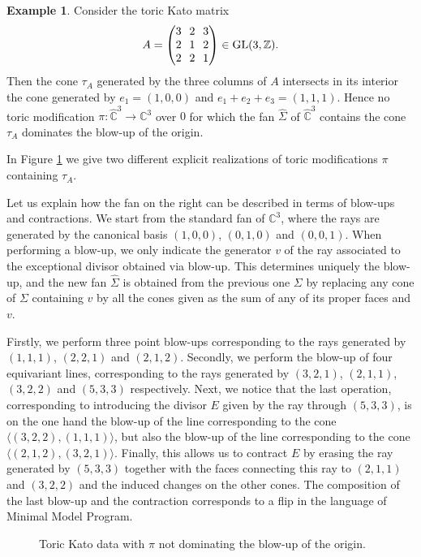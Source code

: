 \documentclass[JEP,XML,SOM,Unicode,NoFloatCountersInSection]{cedram}
\theoremstyle{definition}
\newtheorem{example}[theorem]{Example}
\newcommand{\CC}{\mathbb{C}}
\newcommand{\ZZ}{\mathbb{Z}}
\DeclareMathOperator{\GL}{GL}
\begin{document}
\begin{example}
Consider the toric Kato matrix
\[\arraycolsep3.5pt
A=\begin{pmatrix}
3 & 2 & 3 \\
2 & 1 & 2 \\
2 & 2 & 1
\end{pmatrix}
\in \GL(3,\ZZ).
\]
Then the cone $\tau_A$ generated by the three columns of $A$ intersects in its interior the cone generated by $e_1=(1,0,0)$ and $e_1+e_2+e_3=(1,1,1)$. Hence no toric modification $\pi:\hat{\CC}^3 \to \CC^3$ over $0$ for which the fan $\hat{\Sigma}$ of $\hat{\CC}^3$ contains the cone $\tau_A$ dominates the blow-up of the origin.

In Figure \ref{fig:example4} we give two different explicit realizations of toric modifications $\pi$ containing $\tau_A$.

Let us explain how the fan on the right can be described in terms of blow-ups and contractions. We start from the standard fan of $\CC^3$, where the rays are generated by the canonical basis $(1,0,0)$, $(0,1,0)$ and $(0,0,1)$. When performing a blow-up, we only indicate the generator $v$ of the ray associated to the exceptional divisor obtained via blow-up. This determines uniquely the blow-up, and the new fan $\hat{\Sigma}$ is obtained from the previous one $\Sigma$ by replacing any cone of $\Sigma$ containing $v$ by all the cones given as the sum of any of its proper faces and $v$.

Firstly, we perform three point blow-ups corresponding to the rays generated by $(1,1,1)$, $(2,2,1)$ and $(2,1,2)$. Secondly, we perform the blow-up of four equivariant lines, corresponding to the rays generated by $(3,2,1)$, $(2,1,1)$, $(3,2,2)$ and $(5,3,3)$ respectively. Next, we notice that the last operation, corresponding to introducing the divisor $E$ given by the ray through $(5,3,3)$, is on the one hand the blow-up of the line corresponding to the cone $\langle (3,2,2),(1,1,1)\rangle$, but also the blow-up of the line corresponding to the cone $\langle (2,1,2),(3,2,1)\rangle$. Finally, this allows us to contract $E$ by erasing the ray generated by $(5,3,3)$ together with the faces connecting this ray to $(2,1,1)$ and $(3,2,2)$ and the induced changes on the other cones. The composition of the last blow-up and the contraction corresponds to a flip in the language of Minimal Model Program.

\begin{tiny}
\begin{figure}[h]
\centering
\begin{minipage}[htbp]{\columnwidth}
\def\svgwidth{0.48\columnwidth}

\hfill
\def\svgwidth{0.48\columnwidth}

\end{minipage}
\caption{Toric Kato data with $\pi$ not dominating the blow-up of the origin.}
\label{fig:example4}
\end{figure}
\end{tiny}
\end{example}
\end{document}
